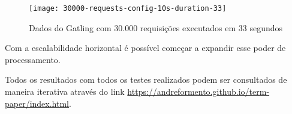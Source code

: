 \begin{figure}[h]
  \texttt{[image: 30000-requests-config-10s-duration-33]}
  \caption{Dados do Gatling com 30.000 requisições executados em 33 segundos}
  \label{30000-requests-config-10s-duration-33}
\end{figure}

Com a escalabilidade horizontal é possível começar a expandir esse poder de processamento.

Todos os resultados com todos os testes realizados podem ser consultados de maneira
iterativa através do link \url{https://andreformento.github.io/term-paper/index.html}.
